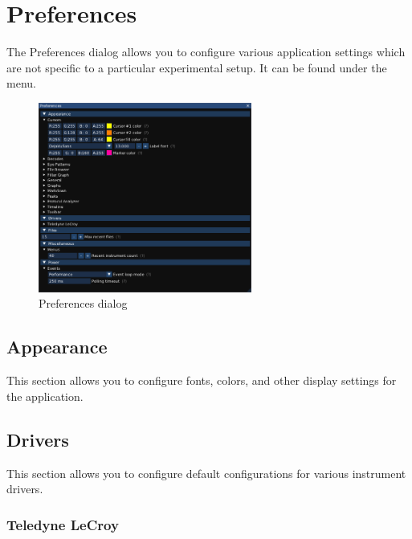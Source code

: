 
\section{Preferences}
\label{dlg:preferences}

The Preferences dialog allows you to configure various application settings which are not specific to a particular
experimental setup. It can be found under the  menu.

\begin{figure}[H]
\centering
\includegraphics[width=7cm]{ng-images/dialog-preferences.png}
\caption{Preferences dialog}
\label{prefs}
\end{figure}

\subsection{Appearance}

This section allows you to configure fonts, colors, and other display settings for the application.


\subsection{Drivers}

This section allows you to configure default configurations for various instrument drivers.

\subsubsection{Teledyne LeCroy}


